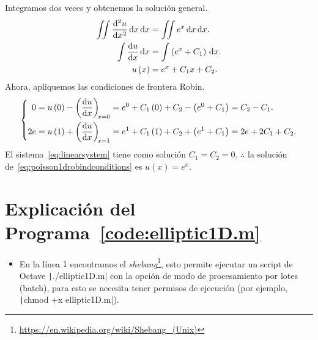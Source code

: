 \begin{problem}
\begin{enumerate}
        \begin{solution}
          Integramos dos veces y obtenemos la solución
          general.
          \begin{align*}
            \iint
            \diff[2]{u}{x}
            \dl x
            \dl x           & =
            \iint
            e^{x}
            \dl x
            \dl x.              \\
            \int
            \diff{u}{x}
            \dl x           & =
            \int
            \left(e^{x}+C_{1}\right)
            \dl x.              \\
            u\left(x\right) & =
            e^{x}+C_{1}x+C_{2}.
          \end{align*}
          Ahora, apliquemos las condiciones de frontera Robin.
          \begin{equation}\label{eq:linearsystem}
            \left\{
            \begin{aligned}
              0
               & =
              u\left(0\right)-
              \diff{u}{x}[x=0]=
              e^{0}+C_{1}\left(0\right)+C_{2}-
              \left(e^{0}+C_{1}\right)=
              C_{2}-C_{1}. \\
              2e
               & =
              u\left(1\right)+
              \diff{u}{x}[x=1]=
              e^{1}+C_{1}\left(1\right)+C_{2}+
              \left(e^{1}+C_{1}\right)=
              2e+2C_{1}+C_{2}.
            \end{aligned}
            \right.
          \end{equation}
          El sistema~\eqref{eq:linearsystem} tiene como solución
          $C_{1}=C_{2}=0$.
          $\therefore$ la solución
          de~\eqref{eq:poisson1drobindconditions} es
          $u\left(x\right)=e^{x}$.
          \noQED
        \end{solution}
\end{enumerate}

\section*{Explicación del Programa~\ref{code:elliptic1D.m}} %

\begin{itemize}
  \item

        En la línea $1$ encontramos el
        \emph{shebang}\footnote{\url{https://en.wikipedia.org/wiki/Shebang_(Unix)}},
        esto permite ejecutar un script de Octave
        \texttt|./elliptic1D.m| con la opción de modo de
        procesamiento por lotes (batch), para esto se necesita
        tener permisos de ejecución (por ejemplo,
        \texttt|chmod +x elliptic1D.m|).


\end{itemize}
\end{problem}
